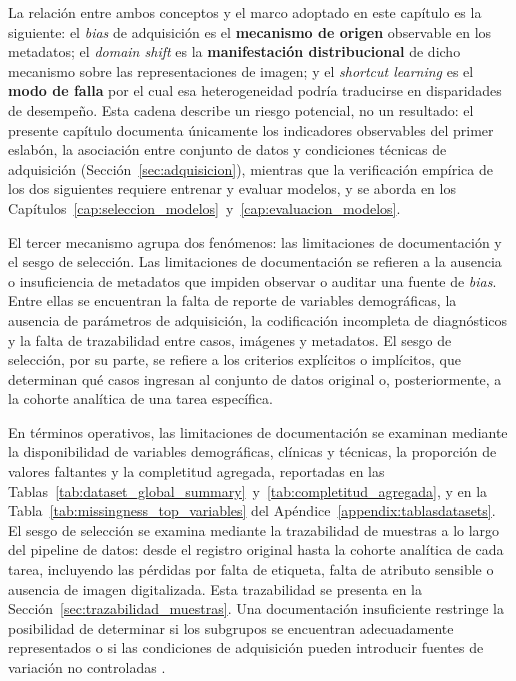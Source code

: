 La relación entre ambos conceptos y el marco adoptado en este capítulo es la siguiente: el \textit{bias} de adquisición es el \textbf{mecanismo de origen} observable en los metadatos; el \textit{domain shift} es la \textbf{manifestación distribucional} de dicho mecanismo sobre las representaciones de imagen; y el \textit{shortcut learning} es el \textbf{modo de falla} por el cual esa heterogeneidad podría traducirse en disparidades de desempeño. Esta cadena describe un riesgo potencial, no un resultado: el presente capítulo documenta únicamente los indicadores observables del primer eslabón, la asociación entre conjunto de datos y condiciones técnicas de adquisición (Sección~\ref{sec:adquisicion}), mientras que la verificación empírica de los dos siguientes requiere entrenar y evaluar modelos, y se aborda en los Capítulos~\ref{cap:seleccion_modelos}~y~\ref{cap:evaluacion_modelos}.

El tercer mecanismo agrupa dos fenómenos: las limitaciones de documentación y el sesgo de selección. Las limitaciones de documentación se refieren a la ausencia o insuficiencia de metadatos que impiden observar o auditar una fuente de \textit{bias}. Entre ellas se encuentran la falta de reporte de variables demográficas, la ausencia de parámetros de adquisición, la codificación incompleta de diagnósticos y la falta de trazabilidad entre casos, imágenes y metadatos. El sesgo de selección, por su parte, se refiere a los criterios explícitos o implícitos, que determinan qué casos ingresan al conjunto de datos original o, posteriormente, a la cohorte analítica de una tarea específica.

En términos operativos, las limitaciones de documentación se examinan mediante la disponibilidad de variables demográficas, clínicas y técnicas, la proporción de valores faltantes y la completitud agregada, reportadas en las Tablas~\ref{tab:dataset_global_summary}~y~\ref{tab:completitud_agregada}, y en la Tabla~\ref{tab:missingness_top_variables} del Apéndice~\ref{appendix:tablasdatasets}. El sesgo de selección se examina mediante la trazabilidad de muestras a lo largo del pipeline de datos: desde el registro original hasta la cohorte analítica de cada tarea, incluyendo las pérdidas por falta de etiqueta, falta de atributo sensible o ausencia de imagen digitalizada. Esta trazabilidad se presenta en la Sección~\ref{sec:trazabilidad_muestras}. Una documentación insuficiente restringe la posibilidad de determinar si los subgrupos se encuentran adecuadamente representados o si las condiciones de adquisición pueden introducir fuentes de variación no controladas \parencite{galanty2024}.

